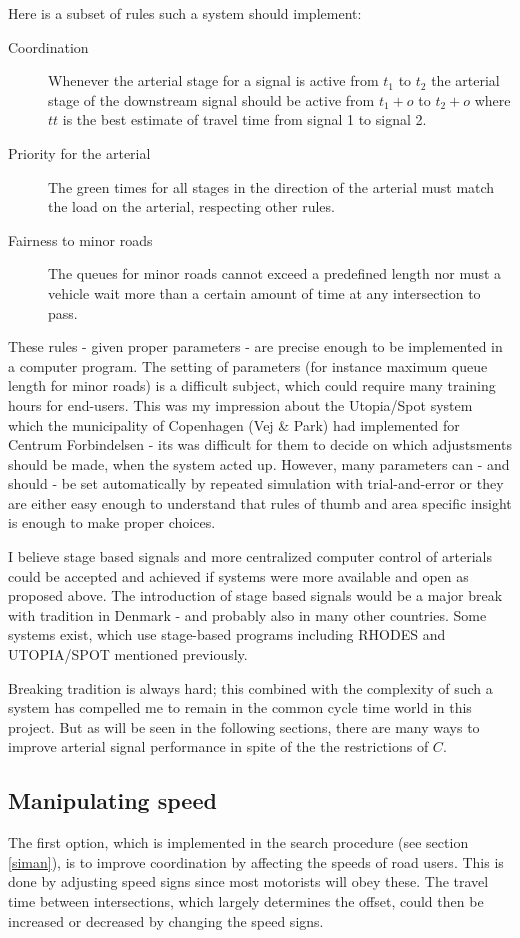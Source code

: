 Here is a subset of rules such a system should implement:

\begin{description}
\item[Coordination]
Whenever the arterial stage for a signal is active from $t_1$ to $t_2$ the arterial stage of the downstream signal should be active from $t_1 + o$ to $t_2 + o$ where $tt$ is the best estimate of travel time from signal 1 to signal 2.
\item[Priority for the arterial]
The green times for all stages in the direction of the arterial must match the load on the arterial, respecting other rules.
\item[Fairness to minor roads]
The queues for minor roads cannot exceed a predefined length nor must a vehicle wait more than a certain amount of time at any intersection to pass.
\end{description}

These rules - given proper parameters - are precise enough to be implemented in a computer program. The setting of parameters (for instance maximum queue length for minor roads) is a difficult subject, which could require many training hours for end-users. This was my impression about the Utopia/Spot system which the municipality of Copenhagen (Vej \& Park) had implemented for Centrum Forbindelsen - its was difficult for them to decide on which adjustsments should be made, when the system acted up. 
However, many parameters can - and should - be set automatically by repeated simulation with trial-and-error or they are either easy enough to understand that rules of thumb and area specific insight is enough to make proper choices.

I believe stage based signals and more centralized computer control of arterials could be accepted and achieved if systems were more available and open as proposed above. The introduction of stage based signals would be a major break with tradition in Denmark - and probably also in many other countries. Some systems exist, which use stage-based programs including RHODES \cite{rhodes} and UTOPIA/SPOT \cite{utopia_spot} mentioned previously.

Breaking tradition is always hard; this combined with the complexity of such a system has compelled me to remain in the common cycle time world in this project. But as will be seen in the following sections, there are many ways to improve arterial signal performance in spite of the the restrictions of $C$.

\subsection{Manipulating speed}
The first option, which is implemented in the search procedure (see section \ref{siman}), is to improve coordination by affecting the speeds of road users. This is done by adjusting speed signs since most motorists will obey these. The travel time between intersections, which largely determines the offset, could then be increased or decreased by changing the speed signs. 

